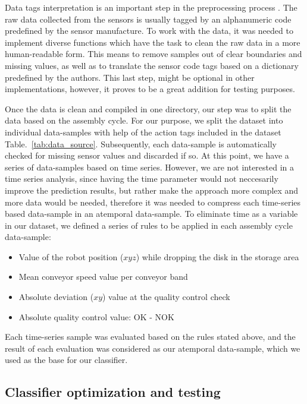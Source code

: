 \documentclass[5p,times,procedia]{elsarticle}
\begin{document}
Data tags interpretation is an important step in the preprocessing process \cite{goodfellow2016deep}. The raw data collected from the sensors is usually tagged by an alphanumeric code predefined by the sensor manufacture. To work with the data, it was needed to implement diverse functions which have the task to clean the raw data in a more human-readable form. This means to remove samples out of clear boundaries and missing values, as well as to translate the sensor code tags based on a dictionary predefined by the authors. This last step, might be optional in other implementations, however, it proves to be a great addition for testing purposes.

Once the data is clean and compiled in one directory, our step was to split the data based on the assembly cycle. For our purpose, we split the dataset into individual data-samples with help of the action tags included in the dataset Table.~\ref{tab:data_source}. Subsequently, each data-sample is automatically checked for missing sensor values and discarded if so. At this point, we have a series of data-samples based on time series. However, we are not interested in a time series analysis, since having the time parameter would not neccesarily improve the prediction results, but rather make the approach more complex and more data would be needed, therefore it was needed to compress each time-series based data-sample in an atemporal data-sample.
To eliminate time as a variable in our dataset, we defined a series of rules to be applied in each assembly cycle data-sample:

\begin{itemize}
       \item Value of the robot position ($xyz$) while dropping the disk in the storage area
       \item Mean conveyor speed value per conveyor band
       \item Absolute deviation ($xy$) value at the quality control check
       \item Absolute quality control value: OK - NOK
\end{itemize}

Each time-series sample was evaluated based on the rules stated above, and the result of each evaluation was considered as our atemporal data-sample, which we used as the base for our classifier.

\subsection{Classifier optimization and testing}\label{sec:ml_exp}
\end{document}
